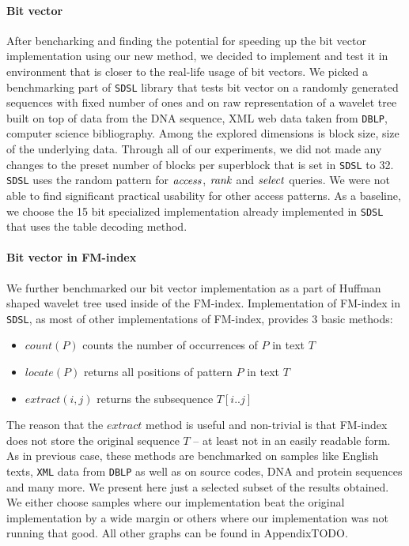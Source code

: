 \paragraph{Bit vector}

After bencharking and finding the potential for speeding up the bit vector implementation using
our new method, we decided to implement and test it in environment that is closer to the real-life
usage of bit vectors. We picked a benchmarking part of \texttt{SDSL} library that tests bit vector
on a randomly generated sequences with fixed number of ones and on raw representation of a wavelet
tree built on top of data from the DNA sequence, XML web data taken from \texttt{DBLP}, computer
science bibliography. Among the explored dimensions is block size, size of the underlying data.
Through all of our experiments, we did not made any changes to the preset number of blocks per
superblock that is set in \texttt{SDSL} to 32. \texttt{SDSL} uses the random pattern for $\mathit{access}$,
$\mathit{rank}$ and $\mathit{select}$ queries. We were not able to find significant practical usability for other
access patterns. As a baseline, we choose the 15 bit specialized implementation already implemented
in \texttt{SDSL} that uses the table decoding method.

\paragraph{Bit vector in FM-index}

We further benchmarked our bit vector implementation as a part of Huffman shaped wavelet tree
used inside of the FM-index. Implementation of FM-index in \texttt{SDSL}, as most of other
implementations of FM-index, provides 3 basic methods:

\begin{itemize}
	\item $\mathit{count}(P)$ counts the number of occurrences of $P$ in text $T$
	\item $\mathit{locate}(P)$ returns all positions of pattern $P$ in text $T$
	\item $\mathit{extract}(i, j)$ returns the subsequence $T[i..j]$
\end{itemize}

The reason that the $\mathit{extract}$ method is useful and non-trivial is that FM-index
does not store the original sequence $T$ -- at least not in an easily readable form.
As in previous case, these methods are benchmarked on samples like English texts, \texttt{XML}
data from \texttt{DBLP} as well as on source codes, DNA and protein sequences and many more.
We present here just a selected subset of the results obtained. We either choose samples
where our implementation beat the original implementation by a wide margin or others where
our implementation was not running that good. All other graphs can be found in AppendixTODO.

